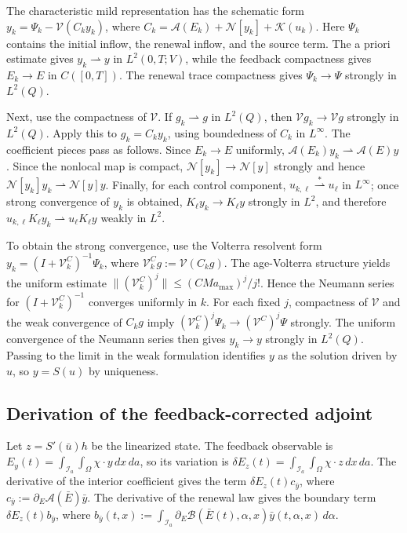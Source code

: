 \documentclass[pdflatex,sn-mathphys-num]{sn-jnl}
\theoremstyle{plain}
\theoremstyle{definition}
\theoremstyle{remark}
\begin{document}
The characteristic mild representation has the schematic form
\(y_k=\Psi_k-\mathcal V(C_ky_k)\), where \(C_k=\mathcal A(E_k)+\mathcal N[y_k]
+\mathcal K(u_k)\). Here \(\Psi_k\) contains the initial inflow, the renewal
inflow, and the source term. The a priori estimate gives \(y_k\rightharpoonup
y\) in \(L^2(0,T;V)\), while the feedback compactness gives \(E_k\to E\) in
\(C([0,T])\). The renewal trace compactness gives \(\Psi_k\to\Psi\) strongly
in \(L^2(Q)\).

Next, use the compactness of \(\mathcal V\). If \(g_k\rightharpoonup g\) in
\(L^2(Q)\), then \(\mathcal Vg_k\to\mathcal Vg\) strongly in \(L^2(Q)\). Apply
this to \(g_k=C_ky_k\), using boundedness of \(C_k\) in \(L^\infty\). The
coefficient pieces pass as follows. Since \(E_k\to E\) uniformly,
\(\mathcal A(E_k)y_k\rightharpoonup \mathcal A(E)y\). Since the nonlocal map is compact,
\(\mathcal N[y_k]\to\mathcal N[y]\) strongly and hence
\(\mathcal N[y_k]y_k\rightharpoonup\mathcal N[y]y\). Finally, for each control
component, \(u_{k,\ell}\overset{*}{\rightharpoonup}u_\ell\) in \(L^\infty\);
once strong convergence of \(y_k\) is obtained, \(K_\ell y_k\to K_\ell y\)
strongly in \(L^2\), and therefore \(u_{k,\ell}K_\ell y_k\rightharpoonup
u_\ell K_\ell y\) weakly in \(L^2\).

To obtain the strong convergence, use the Volterra resolvent form
\(y_k=(I+\mathcal V_k^C)^{-1}\Psi_k\), where
\(\mathcal V_k^Cg:=\mathcal V(C_kg)\). The age-Volterra structure yields the
uniform estimate \(\|(\mathcal V_k^C)^j\|\le (CMa_{\max})^j/j!\). Hence the
Neumann series for \((I+\mathcal V_k^C)^{-1}\) converges uniformly in \(k\).
For each fixed \(j\), compactness of \(\mathcal V\) and the weak convergence
of \(C_kg\) imply \((\mathcal V_k^C)^j\Psi_k\to(\mathcal V^C)^j\Psi\) strongly.
The uniform convergence of the Neumann series then gives \(y_k\to y\) strongly
in \(L^2(Q)\). Passing to the limit in the weak formulation identifies \(y\)
as the solution driven by \(u\), so \(y=S(u)\) by uniqueness.

\subsection{Derivation of the feedback-corrected adjoint}
\label{app:feedback-adjoint}

Let \(z=S'(\bar u)h\) be the linearized state. The feedback observable is
\(E_y(t)=\int_{\mathcal I_a}\int_\Omega\chi\cdot y\,dx\,da\), so its variation is
\(\delta E_z(t)=\int_{\mathcal I_a}\int_\Omega\chi\cdot z\,dx\,da\). The derivative of
the interior coefficient gives the term \(\delta E_z(t)c_{\bar y}\), where
\(c_{\bar y}:=\partial_E\mathcal A(\bar E)\bar y\). The derivative of the renewal law
gives the boundary term \(\delta E_z(t)b_{\bar y}\), where
\(b_{\bar y}(t,x):=\int_{\mathcal I_a}\partial_E\mathcal B(\bar E(t),\alpha,x)
\bar y(t,\alpha,x)\,d\alpha\).
\end{document}
